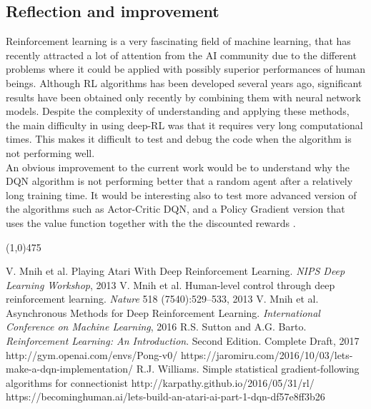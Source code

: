 \documentclass[a4paper, 11pt]{article}
\newcommand{\hl}{\begin{center} \line(1,0){475} \end{center}} %
\begin{document}
\subsection{Reflection and improvement}
Reinforcement learning is a very fascinating field of machine learning, that has recently attracted a lot of attention from the AI community due to the different problems where it could be applied with possibly superior performances of human beings. Although RL algorithms has been developed several years ago, significant results have been obtained only recently by combining them with neural network models. Despite the complexity of understanding and applying these methods, the main difficulty in using deep-RL was that it requires very long computational times. This makes it difficult to test and debug the code when the algorithm is not performing well.\\
An obvious improvement to the current work would be to understand why the DQN algorithm is not performing better that a random agent after a relatively long training time. It would be interesting also to test more advanced version of the algorithms such as Actor-Critic DQN, and a Policy Gradient version that uses the value function together with the the discounted rewards \cite{Mnih2016}. 
  
\hl

\begin{thebibliography}{9}
  V. Mnih et al. Playing Atari With Deep Reinforcement Learning. \emph{NIPS Deep Learning Workshop}, 2013
  V. Mnih et al. Human-level control through deep reinforcement learning. \emph{Nature} 518 (7540):529--533, 2013
  V. Mnih et al. Asynchronous Methods for Deep Reinforcement Learning. \emph{ International Conference on Machine Learning}, 2016
 R.S. Sutton and A.G. Barto. \emph{Reinforcement Learning: An Introduction}. Second Edition. Complete Draft, 2017
 http://gym.openai.com/envs/Pong-v0/
 https://jaromiru.com/2016/10/03/lets-make-a-dqn-implementation/
  R.J. Williams. Simple statistical gradient-following algorithms for connectionist
 http://karpathy.github.io/2016/05/31/rl/
 https://becominghuman.ai/lets-build-an-atari-ai-part-1-dqn-df57e8ff3b26

\end{thebibliography}
\end{document}
